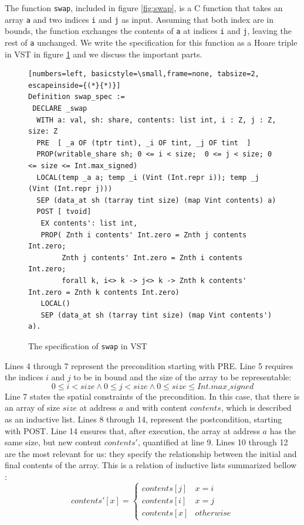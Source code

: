 \documentclass[onecolumn, preprint]{sigplanconf}
\begin{document}
The function \texttt{swap}, included in figure \ref{fig:swap}, is a C function that takes an array \texttt{a} and two indices \texttt{i} and \texttt{j} as input. Assuming that both index are in bounds, the function exchanges the contents of \texttt{a} at indices \texttt{i} and \texttt{j}, leaving the rest of \texttt{a} unchanged. We write the specification for this function as a Hoare triple in VST in figure \ref{fig:hoarswap} and we discuss the important parts.

\begin{figure}[ht]
\begin{lstlisting}[numbers=left, basicstyle=\small,frame=none, tabsize=2, escapeinside={(*}{*)}]  
Definition swap_spec :=
 DECLARE _swap
  WITH a: val, sh: share, contents: list int, i : Z, j : Z, size: Z
  PRE  [ _a OF (tptr tint), _i OF tint, _j OF tint  ]
  PROP(writable_share sh; 0 <= i < size;  0 <= j < size; 0 <= size <= Int.max_signed)
  LOCAL(temp _a a; temp _i (Vint (Int.repr i)); temp _j (Vint (Int.repr j)))
  SEP (data_at sh (tarray tint size) (map Vint contents) a)
  POST [ tvoid]
   EX contents': list int,
   PROP( Znth i contents' Int.zero = Znth j contents Int.zero;
        Znth j contents' Int.zero = Znth i contents Int.zero;
        forall k, i<> k -> j<> k -> Znth k contents' Int.zero = Znth k contents Int.zero)
   LOCAL()
   SEP (data_at sh (tarray tint size) (map Vint contents') a).
\end{lstlisting}
\caption{The specification of \texttt{swap} in VST}
\label{fig:hoarswap}
\end{figure}
Lines 4 through 7 represent the precondition starting with PRE. Line 5 requires the indices $i$ and $j$ to be in bound and the size of the array to be representable:
$$ 0 \leq i < size \wedge 0 \leq j < size  \wedge 0 \leq size \leq Int.max\_signed $$
Line 7 states the spatial constraints of the precondition. In this case, that there is an array of size $size$ at address $a$ and with content $contents$, which is described as an inductive list. Lines 8 through 14, represent the postcondition, starting with POST. Line 14 ensures that, after execution, the array at address $a$ has the same size, but new content $contents'$, quantified at line 9. Lines 10 through 12 are the most relevant for us: they specify the relationship between the initial and final contents of the array. This is a relation of inductive lists summarized bellow :
\begin{equation}
\label{eq:condition}
contents'[x] = \left\{\begin{array}{cc}contents[j] & x = i \\contents[i] & x = j \\contents[x] & otherwise\end{array}\right.
\end{equation}
\end{document}
